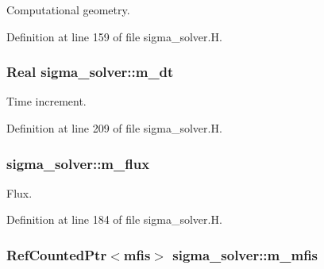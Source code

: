 Computational geometry. 



Definition at line 159 of file sigma\+\_\+solver.\+H.

\subsubsection[{\texorpdfstring{m\+\_\+dt}{m_dt}}]{\setlength{\rightskip}{0pt plus 5cm}Real sigma\+\_\+solver\+::m\+\_\+dt\hspace{0.3cm}{\ttfamily [protected]}}\hypertarget{classsigma__solver_a18b481ad7d342e4a846563e7a8eace53}{}\label{classsigma__solver_a18b481ad7d342e4a846563e7a8eace53}


Time increment. 



Definition at line 209 of file sigma\+\_\+solver.\+H.

\subsubsection[{\texorpdfstring{m\+\_\+flux}{m_flux}}]{ sigma\+\_\+solver\+::m\+\_\+flux\hspace{0.3cm}{\ttfamily [protected]}}\hypertarget{classsigma__solver_ac3e3e032fdac9877851a3c73a7598f02}{}\label{classsigma__solver_ac3e3e032fdac9877851a3c73a7598f02}


Flux. 



Definition at line 184 of file sigma\+\_\+solver.\+H.

\subsubsection[{\texorpdfstring{m\+\_\+mfis}{m_mfis}}]{\setlength{\rightskip}{0pt plus 5cm}Ref\+Counted\+Ptr$<${\bf mfis}$>$ sigma\+\_\+solver\+::m\+\_\+mfis\hspace{0.3cm}{\ttfamily [protected]}}\hypertarget{classsigma__solver_a0c5488e3a54572b3724fecc0cb3d9496}{}\label{classsigma__solver_a0c5488e3a54572b3724fecc0cb3d9496}


